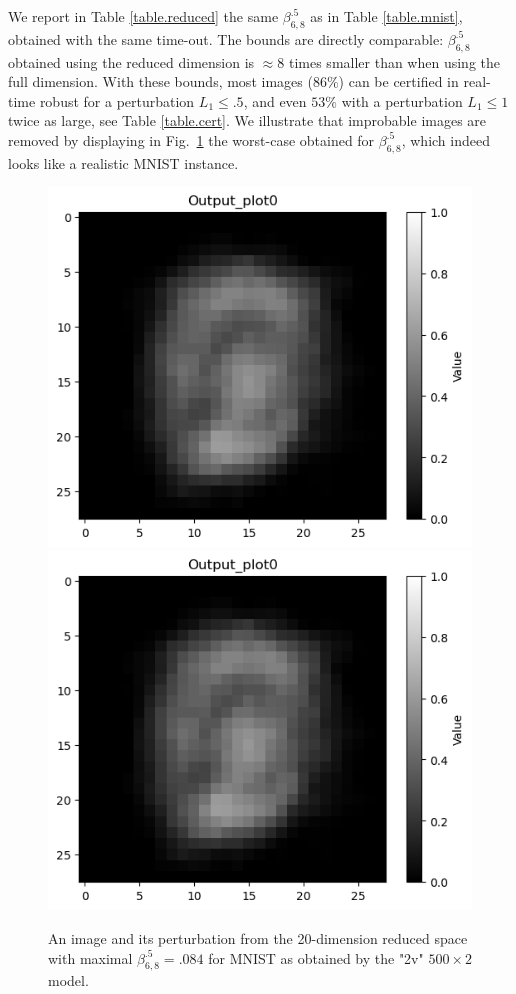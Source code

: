 We report in Table \ref{table.reduced} the same $\beta^{.5}_{6,8}$
as in Table \ref{table.mnist}, obtained with the same time-out. The bounds are directly comparable: $\beta^{.5}_{6,8}$ obtained using the reduced dimension is $\approx 8$ times smaller
than when using the full dimension. With these bounds, most images ($86\%$) can be certified in real-time robust for a perturbation $L_1 \leq .5$, and even $53\%$ with a perturbation $L_1 \leq 1$ twice as large, see Table \ref{table.cert}. We illustrate that improbable images are removed by displaying in Fig.~\ref{fig4} the worst-case obtained for $\beta^{.5}_{6,8}$, which indeed looks like a realistic MNIST instance.



\begin{figure}[t!]
	\centering
\includegraphics[scale=0.5]{redimage.png} \hspace{0.8cm}
\includegraphics[scale=0.5]{redperturb.png}
\caption{An image and its perturbation from the 20-dimension reduced space with maximal $\beta^{.5}_{6,8}=.084$ for MNIST as obtained by the "2v" $500 \times 2$ model.}
\label{fig4}
\end{figure}	

